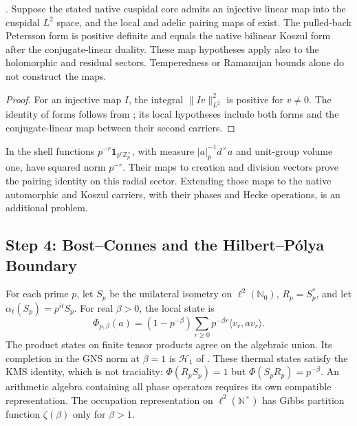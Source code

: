 \begin{theorem}
\label{v4-arith:w5-direct:thm:P3-elementary}
\ClaimStatusProvedHereConditional.
Suppose the stated native cuspidal core admits an injective linear map
into the cuspidal \(L^2\) space, and the local and adelic pairing maps
of  exist. The pulled-back
Petersson form is positive definite and equals the native bilinear
Koszul form after the conjugate-linear duality. These map hypotheses
apply also to the holomorphic and residual sectors. Temperedness or
Ramanujan bounds alone do not construct the maps.
\end{theorem}
\begin{proof}
For an injective map \(I\), the integral \(\|Iv\|_{L^2}^2\) is positive
for \(v\ne0\). The identity of forms follows from
; its local hypotheses include
both forms and the conjugate-linear map between their second carriers.
\end{proof}

\begin{remark}
\label{v4-arith:w5-direct:rem:P3-elementary}
In  the shell functions
\(p^{-r}\mathbf1_{p^r\mathbb Z_p^\times}\), with measure
\(|a|_p^{-1}d^\times a\) and unit-group volume one, have squared norm
\(p^{-r}\). Their maps to creation and division vectors prove the
pairing identity on this radial sector. Extending those maps to the
native automorphic and Koszul carriers, with their phases and Hecke
operations, is an additional problem.
\end{remark}

\subsection{Step 4: Bost--Connes and the Hilbert--P\'olya Boundary}
\label{v4-arith:w5-direct:step-4}

\begin{definition}
\label{v4-arith:w5-direct:def:BC}
For each prime \(p\), let \(S_p\) be the unilateral isometry on
\(\ell^2(\mathbb N_0)\), \(R_p=S_p^*\), and let
\(\alpha_t(S_p)=p^{it}S_p\). For real \(\beta>0\), the local state is
\[
 \Phi_{p,\beta}(a)=(1-p^{-\beta})\sum_{r\ge0}p^{-\beta r}
                 \langle v_r,av_r\rangle.
\]
The product states on finite tensor products agree on the algebraic
union. Its completion in the GNS norm at \(\beta=1\) is
\(\mathcal H_1\) of .
These thermal states satisfy the KMS identity, which is not traciality:
\(\Phi(R_pS_p)=1\) but \(\Phi(S_pR_p)=p^{-\beta}\).
An arithmetic algebra containing all phase operators requires its
own compatible representation. The occupation representation on
\(\ell^2(\mathbb N^\times)\) has Gibbs partition function
\(\zeta(\beta)\) only for \(\beta>1\).
\end{definition}


